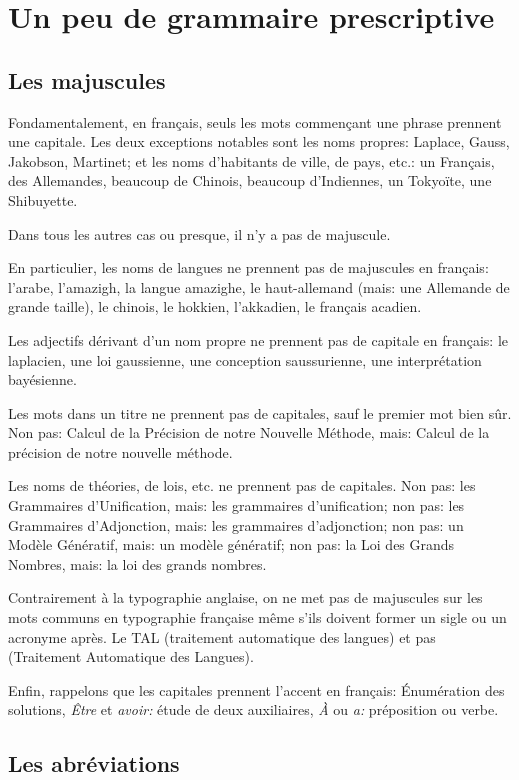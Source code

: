 \documentclass[utf8x]{article-hermes_frenchb}
\begin{document}
\section{Un peu de grammaire prescriptive}


\subsection{Les majuscules}

Fondamentalement, en français, seuls les mots commençant une phrase prennent une capitale.
Les deux exceptions notables sont les noms propres:
Laplace, Gauss, Jakobson, Martinet;
et les noms d'habitants de ville, de pays, etc.:
un Français, des Allemandes, beaucoup de Chinois, beaucoup d'Indiennes, un Tokyoïte, une Shibuyette.

Dans tous les autres cas ou presque, il n'y a pas de majuscule.

En particulier, les noms de langues ne prennent pas de majuscules en français:
l'arabe, l'amazigh, la langue amazighe, le haut-allemand (mais: une Allemande de grande taille), le chinois, le hokkien, l'akkadien, le français acadien.

Les adjectifs dérivant d'un nom propre ne prennent pas de capitale en français:
le laplacien, une loi gaussienne, une conception saussurienne, une interprétation bayésienne.

Les mots dans un titre ne prennent pas de capitales,
sauf le premier mot bien sûr.
Non pas:
Calcul de la Précision de notre Nouvelle Méthode,
mais:
Calcul de la précision de notre nouvelle méthode.

Les noms de théories, de lois, etc. ne prennent pas de capitales.
Non pas:
les Grammaires d'Unification,
mais:
les grammaires d'unification;
non pas:
les Grammaires d'Adjonction,
mais:
les grammaires d'adjonction;
non pas:
un Modèle Génératif,
mais:
un modèle génératif;
non pas:
la Loi des Grands Nombres,
mais:
la loi des grands nombres.

Contrairement à la typographie anglaise, on ne met pas de majuscules sur les mots communs en typographie française même s'ils doivent former un sigle ou un acronyme après. Le TAL (traitement automatique des langues) et pas (Traitement Automatique des Langues).

Enfin, rappelons que les capitales prennent l'accent en français:
\'Enumération des solutions, \emph{\^Etre} et \emph{avoir:} étude de deux auxiliaires, \emph{À} ou \emph{a:} préposition ou verbe. 

\subsection{Les abréviations}
\end{document}
